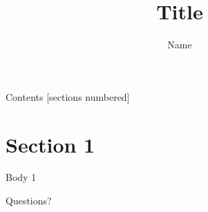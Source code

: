 \documentclass[aspectratio=169,11pt]{beamer}
\author{Name}
\title{Title
\note{
    Note on the first slide
}}
\subtitle{}
\begin{document}
\maketitle

\begin{frame}{Contents}
    [sections numbered]
    \tableofcontents[hideallsubsections]

\end{frame}

\section{Section 1}

\begin{frame}{Body 1}

\end{frame}


\begin{frame}[standout]
  Questions?
\end{frame}
\end{document}
